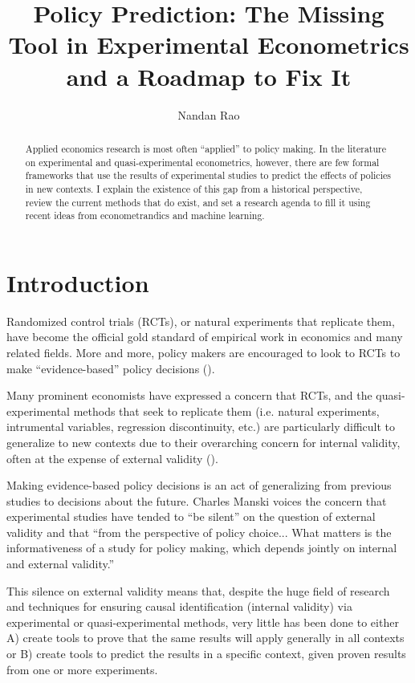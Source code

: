 \documentclass[a4paper,12pt]{article}
\title{ Policy Prediction: The Missing Tool in Experimental Econometrics and a Roadmap to Fix It  }
\author{Nandan Rao}
\begin{document}
\maketitle

\begin{abstract}
Applied economics research is most often ``applied'' to policy making. In the literature on experimental and quasi-experimental econometrics, however, there are few formal frameworks that use the results of experimental studies to predict the effects of policies in new contexts. I explain the existence of this gap from a historical perspective, review the current methods that do exist, and set a research agenda to fill it using recent ideas from econometrandics and machine learning. 
\end{abstract}


\section{Introduction}

Randomized control trials (RCTs), or natural experiments that replicate them, have become the official gold standard of empirical work in economics and many related fields. More and more, policy makers are encouraged to look to RCTs to make ``evidence-based'' policy decisions (\cite{Manski2013, Cartwright2013}). 

Many prominent economists have expressed a concern that RCTs, and the quasi-experimental methods that seek to replicate them (i.e. natural experiments, intrumental variables, regression discontinuity, etc.) are particularly difficult to generalize to new contexts due to their overarching concern for internal validity, often at the expense of external validity (\cite{Heckman1995, Heckman2008, Deaton2010, Manski2013, Deaton2018}). 

Making evidence-based policy decisions is an act of generalizing from previous studies to decisions about the future. Charles Manski \parencite*{Manski2013} voices the concern that experimental studies have tended to ``be silent'' on the question of external validity and that ``from the perspective of policy choice... What matters is the informativeness of a study for policy making, which depends jointly on internal and external validity.''

This silence on external validity means that, despite the huge field of research and techniques for ensuring causal identification (internal validity) via experimental or quasi-experimental methods, very little has been done to either A) create tools to prove that the same results will apply generally in all contexts or B) create tools to predict the results in a specific context, given proven results from one or more experiments. 
\end{document}
